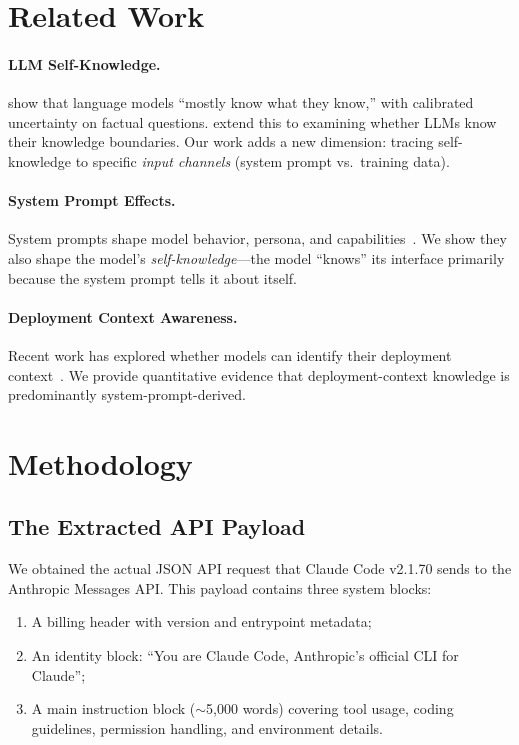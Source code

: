 \documentclass[10pt,twocolumn]{article}
\begin{document}
\section{Related Work}

\paragraph{LLM Self-Knowledge.}
\citet{kadavath2022language} show that language models ``mostly know what they know,'' with calibrated uncertainty on factual questions.
\citet{yin2023large} extend this to examining whether LLMs know their knowledge boundaries.
Our work adds a new dimension: tracing self-knowledge to specific \textit{input channels} (system prompt vs.\ training data).

\paragraph{System Prompt Effects.}
System prompts shape model behavior, persona, and capabilities~\citep{white2023prompt}.
We show they also shape the model's \textit{self-knowledge}---the model ``knows'' its interface primarily because the system prompt tells it about itself.

\paragraph{Deployment Context Awareness.}
Recent work has explored whether models can identify their deployment context~\citep{perez2023discovering}.
We provide quantitative evidence that deployment-context knowledge is predominantly system-prompt-derived.

\section{Methodology}

\subsection{The Extracted API Payload}

We obtained the actual JSON API request that Claude Code v2.1.70 sends to the Anthropic Messages API.
This payload contains three system blocks:
\begin{enumerate}
  \item A billing header with version and entrypoint metadata;
  \item An identity block: ``You are Claude Code, Anthropic's official CLI for Claude'';
  \item A main instruction block (${\sim}$5,000 words) covering tool usage, coding guidelines, permission handling, and environment details.
\end{enumerate}
\end{document}
